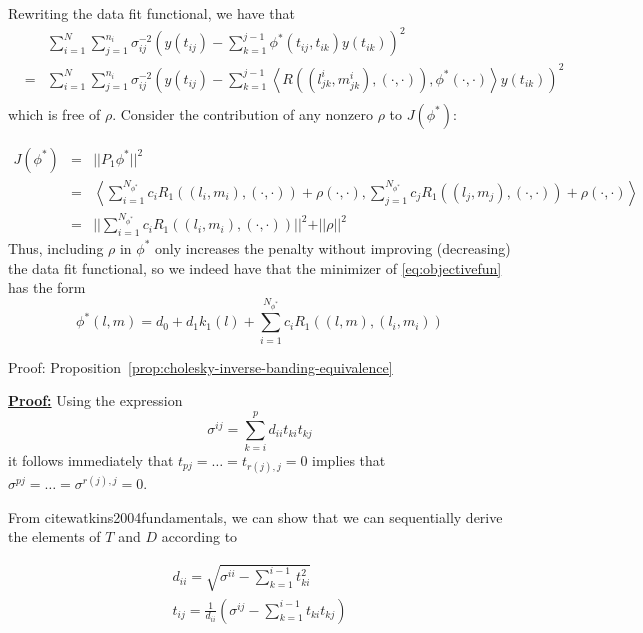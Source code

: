 \documentclass[12pt]{article}
\theoremstyle{definition}
\begin{document}
Rewriting the data fit functional, we have that  
 \begin{eqnarray*}
&\mbox{ }&\sum_{i=1}^N \sum_{j=1}^{n_i} \sigma_{ij}^{-2} \left(y\left(t_{ij}\right) - \sum_{k=1}^{j-1} \phi^*\left(t_{ij}, t_{ik}  \right) y\left(t_{ik}\right)  \right)^2  \\ 
&=& \sum_{i=1}^N \sum_{j=1}^{n_i} \sigma_{ij}^{-2} \left(y\left(t_{ij}\right) - \sum_{k=1}^{j-1} \left< R\left(\left(l^i_{jk},m^i_{jk}\right),\left(\cdot,\cdot\right) \right),\phi^*\left(\cdot,\cdot\right)\right> y\left(t_{ik}\right)  \right)^2  \\
 \end{eqnarray*}
\noindent
which is free of $\rho$. Consider the contribution of any nonzero $\rho$ to $J\left(\phi^*\right)$: 
  
 \begin{eqnarray*}
 J\left(\phi^*\right) &=& \vert \vert  P_1\phi^* \vert \vert^2\\
 &=& \left< \sum_{i=1}^{N_{\phi^*}}  c_i R_1\left( \left(l_i,m_i\right),\left(\cdot,\cdot\right) \right) + \rho\left(\cdot,\cdot \right), \sum_{j=1}^{N_{\phi^*}} c_j R_1\left( \left(l_j,m_j\right),\left(\cdot,\cdot\right) \right) + \rho\left(\cdot,\cdot\right)\right> \\
 &=& \vert \vert \sum_{i=1}^{N_{\phi^*}}  c_i R_1\left(\left(l_i,m_i\right),\left(\cdot,\cdot\right) \right) \vert \vert^2 + \vert \vert  \rho \vert \vert^2 
 \end{eqnarray*}
\noindent
Thus, including $\rho$ in $\phi^*$ only increases the penalty without improving (decreasing) the data fit functional, so we indeed have that the minimizer of \eqref{eq:objectivefun} has the form
\begin{equation}
 \phi^*\left(l,m\right) =  d_0 + d_1k_1\left(l\right) + \sum_{i=1}^{N_{\phi^*}} c_i R_1\left( \left(l,m\right) , \left(l_i,m_i \right)\right)
 \label{eq:finitedimsolution}
 \end{equation}


Proof: Proposition~\ref{prop:cholesky-inverse-banding-equivalence}

\underline{\bf Proof:} Using the expression
\[
\sigma^{ij} = \sum_{k=i}^p d_{ii}t_{ki}t_{kj}
\]
it follows immediately that $t_{pj} = \dots = t_{r\left(j\right),j} = 0$ implies that $\sigma^{pj} = \dots = \sigma^{r\left(j\right),j} = 0$.

From cite{watkins2004fundamentals}, we can show that we can sequentially derive the elements of $T$ and $D$ according to 

\begin{eqnarray*}
d_{ii} = \sqrt{\sigma^{ii}-\sum_{k=1}^{i-1} t_{ki}^2 }\\
t_{ij} = \frac{1}{d_{ii}}\left(\sigma^{ij} - \sum_{k=1}^{i-1} t_{ki}t_{kj} \right)
\end{eqnarray*}
\noindent
\end{document}
